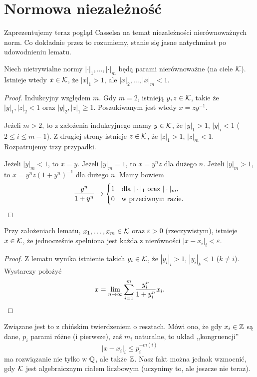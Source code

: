 \section{Normowa niezależność}
Zaprezentujemy teraz pogląd Casselsa na temat niezależności nierównoważnych norm.
Co dokładnie przez to rozumiemy, stanie się jasne natychmiast po udowodnieniu lematu.

\begin{lemat}
	Niech nietrywialne normy $|\cdot|_1, \ldots, |\cdot|_m$ będą parami nierównoważne (na ciele $\mathcal K$).
	Istnieje wtedy $x \in \mathcal K$, że $|x|_1 > 1$, ale $|x|_2, \ldots, |x|_m < 1$.
\end{lemat}

\begin{proof}
	Indukcyjny względem $m$.
	Gdy $m = 2$, istnieją $y, z \in \mathcal K$, takie że $|y|_1, |z|_2 < 1$ oraz $|y|_2, |z|_1 \ge 1$.
	Poszukiwanym jest wtedy $x = zy^{-1}$.
	
	Jeżeli $m > 2$, to z założenia indukcyjnego mamy $y \in \mathcal K$, że $|y|_1 > 1$, $|y|_i < 1$ ($2 \le i \le m-1$).
	Z drugiej strony istnieje $z \in \mathcal K$, że $|z|_1 > 1$, $|z|_m < 1$.
	Rozpatrujemy trzy przypadki.

	Jeżeli $|y|_m < 1$, to $x = y$.
	Jeżeli $|y|_m = 1$, to $x = y^nz$ dla dużego $n$.
	Jeżeli $|y|_m > 1$, to $x = y^n z (1 + y^n)^{-1}$ dla dużego $n$.
	Mamy bowiem
	\[
		\frac{y^n}{1 + y^n} \to \begin{cases} 
		1 & \text{dla } |\cdot|_1 \text{ oraz } |\cdot|_m, \\
		0 & \text{w przeciwnym razie.}
		\end{cases} \qedhere
	\]
\end{proof}

\begin{fakt}
	Przy założeniach lematu, $x_1, \ldots, x_m \in \mathcal K$ oraz $\varepsilon > 0$ (rzeczywistym), istnieje $x \in \mathcal K$, że jednocześnie spełniona jest każda z nierówności $|x-x_i|_i < \varepsilon$.
\end{fakt}

\begin{proof}
	Z lematu wynika istnienie takich $y_i \in \mathcal K$, że $|y_i|_i > 1$, $|y_i|_k < 1$ ($k \neq i$).
	Wystarczy położyć
	\[
		x = \lim_{n \to \infty} \sum_{i=1}^m \frac{y_i^n}{1 + y_i^n} x_i. \qedhere
	\]
\end{proof}

Związane jest to z chińskim twierdzeniem o resztach.
Mówi ono, że gdy $x_i \in \mathbb Z$ są dane, $p_i$ parami różne (i pierwsze), zaś $m_i$ naturalne, to układ ,,kongruencji''
\[
	|x - x_i|_i \le p_i^{-m(i)}
\]
ma rozwiązanie nie tylko w $\mathbb Q$, ale także $\mathbb Z$.
Nasz fakt można jednak wzmocnić, gdy $\mathcal K$ jest algebraicznym ciałem liczbowym (uczynimy to, ale jeszcze nie teraz).

